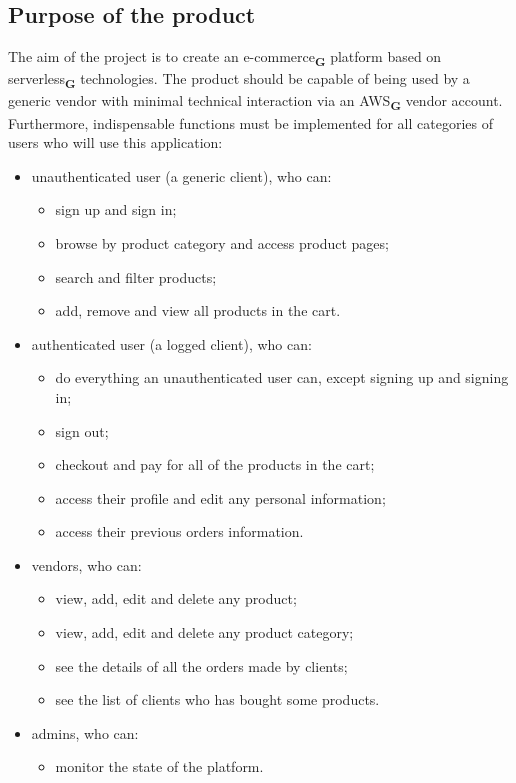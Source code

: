 \subsection{Purpose of the product}
The aim of the project is to create an e-commerce\textsubscript{\textbf{G}} platform based on serverless\textsubscript{\textbf{G}} technologies.
The product should be capable of being used by a generic vendor with minimal technical interaction
via an AWS\textsubscript{\textbf{G}} vendor account.
Furthermore, indispensable functions must be implemented for all categories of users who will use this application:
\begin{itemize}
    \item unauthenticated user (a generic client), who can:
          \begin{itemize}
              \item sign up and sign in;
              \item browse by product category and access product pages;
              \item search and filter products;
              \item add, remove and view all products in the cart.
          \end{itemize}
    \item authenticated user (a logged client), who can:
          \begin{itemize}
              \item do everything an unauthenticated user can, except signing up and signing in;
              \item sign out;
              \item checkout and pay for all of the products in the cart;
              \item access their profile and edit any personal information;
              \item access their previous orders information.
          \end{itemize}
    \item vendors, who can:
          \begin{itemize}
              \item view, add, edit and delete any product;
              \item view, add, edit and delete any product category;
              \item see the details of all the orders made by clients;
              \item see the list of clients who has bought some products.
          \end{itemize}
    \item admins, who can:
          \begin{itemize}
              \item monitor the state of the platform.
          \end{itemize}
\end{itemize}
